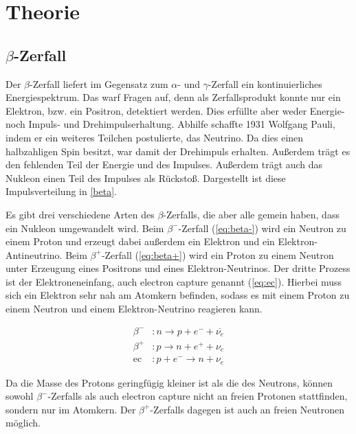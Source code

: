 \setlength{\multlinegap}{0pt}
\section{Theorie}
\subsection{$\beta$-Zerfall}
Der $\beta$-Zerfall liefert im Gegensatz zum $\alpha$- und $\gamma$-Zerfall ein kontinuierliches Energiespektrum. Das warf Fragen auf, denn als Zerfallsprodukt konnte nur ein Elektron, bzw. ein Positron, detektiert werden. Dies erfüllte aber weder Energie- noch Impuls- und Drehimpulserhaltung. Abhilfe schaffte 1931 Wolfgang Pauli, indem er ein weiteres Teilchen postulierte, das Neutrino. Da dies einen halbzahligen Spin besitzt, war damit der Drehimpuls erhalten. Außerdem trägt es den fehlenden Teil der Energie und des Impulses. Außerdem trägt auch das Nukleon einen Teil des Impulses als Rückstoß. Dargestellt ist diese Impulsverteilung in \cref{beta}.


Es gibt drei verschiedene Arten des $\beta$-Zerfalls, die aber alle gemein haben, dass ein Nukleon umgewandelt wird. Beim $\beta^-$-Zerfall (\cref{eq:beta-}) wird ein Neutron zu einem Proton und erzeugt dabei außerdem ein Elektron und ein Elektron-Antineutrino. Beim $\beta^+$-Zerfall (\cref{eq:beta+}) wird ein Proton zu einem Neutron unter Erzeugung eines Positrons und eines Elektron-Neutrinos. Der dritte Prozess ist der Elektroneneinfang, auch electron capture genannt (\cref{eq:ec}). Hierbei muss sich ein Elektron sehr nah am Atomkern befinden, sodass es mit einem Proton zu einem Neutron und einem Elektron-Neutrino reagieren kann.

\begin{align}
	\beta^-&:	 n \rightarrow p + e^- + \overline{\nu_e} \label{eq:beta-} \\
	\beta^+&:	 p \rightarrow n + e^+ + \nu_e \label{eq:beta+} \\
	\text{ec}&: p + e^- \rightarrow n + \nu_e \label{eq:ec}
\end{align}

Da die Masse des Protons geringfügig kleiner ist als die des Neutrons, können sowohl $\beta^-$-Zerfalls als auch electron capture nicht an freien Protonen stattfinden, sondern nur im Atomkern. Der $\beta^+$-Zerfalls dagegen ist auch an freien Neutronen möglich.

